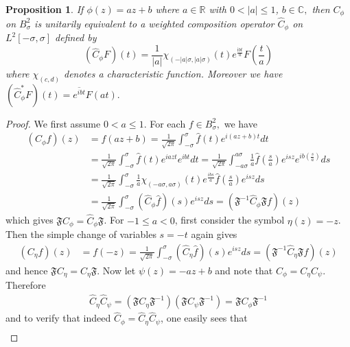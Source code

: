 \documentclass[11pt]{amsart}%
\numberwithin{equation}{section}
\theoremstyle{plain}
\newtheorem{prop}[thm]{Proposition}
\theoremstyle{definition}
\theoremstyle{definition}
\begin{document}
\begin{prop}\label{adjoint formula} If $\phi(z)=az+b$ where $a\in \mathbb{R}$ with $0<|a|\leq 1$, $b\in \mathbb{C},$ then $C_{\phi}$ on $ B^2_{\sigma}$ is unitarily equivalent to a weighted composition operator $\widehat{C}_{\phi}$ on $L^2[-\sigma,\sigma]$ defined by 
\[(\widehat{C}_{\phi}F)(t)=\frac{1}{|a|}\chi_{(-|a|\sigma, |a|\sigma)}(t)e^{\frac{\mathrm{i}bt}{a}}F\left(\frac{t}{a}\right)\] 
where $\chi_{(c,d)}$ denotes a characteristic function. Moreover we have $(\widehat{C}_{\phi}^*F)(t)=\overline{e^{ibt}}F(at).$
\end{prop}
\begin{proof} We first assume $0<a\leq 1.$ For each $f\in B^2_{\sigma},$ we have
\begin{align}
(C_{\phi}f)(z)&=f(az+b)=\frac{1}{\sqrt{2\pi}}\int^\sigma_{-\sigma}\widehat{f}(t)e ^{i(az+b)t}dt\nonumber\\
&=\frac{1}{\sqrt{2\pi}}\int^\sigma_{-\sigma}\widehat{f}(t)e ^{iazt}e^{ibt}dt=\frac{1}{\sqrt{2\pi}}\int^{a\sigma}_{-a\sigma}\frac{1}{a}\widehat{f}\left(\frac{s}{a}\right)e ^{isz}e^{ib\left(\frac{s}{a}\right)}ds\nonumber\\
&=\frac{1}{\sqrt{2\pi}}\int^{\sigma}_{-\sigma}\frac{1}{a}\chi_{(-a\sigma, a\sigma)}(t)e^{\frac{ibs}{a}}\widehat{f}\left(\frac{s}{a}\right)e ^{isz}ds\nonumber\\
&=\frac{1}{\sqrt{2\pi}}\int^{\sigma}_{-\sigma}(\widehat{C}_{\phi}\widehat{f})(s)e ^{isz}ds=(\mathfrak{F}^{-1}\widehat{C}_\phi\mathfrak{F}f)(z)\nonumber
\end{align}
which gives $\mathfrak{F}C_{\phi}= \widehat{C}_{\phi}\mathfrak{F}$. For $-1\leq a <0$, first consider the symbol $\eta(z)=-z$. Then the simple change of variables $s=-t$ again gives
\begin{align}\label{eqc3}
(C_{\eta}f)(z)&=f(-z)=\frac{1}{\sqrt{2\pi}}\int^{\sigma}_{-\sigma}(\widehat{C}_{\eta}\widehat{f})(s)e ^{isz}ds=(\mathfrak{F}^{-1}\widehat{C}_\eta\mathfrak{F}f)(z)
\end{align}
and hence $\mathfrak{F}C_{\eta}= \widehat{C}_{\eta}\mathfrak{F}.$  Now let $\psi(z)=-az+b$ and note that $C_{\phi}=C_{\eta}C_{\psi}.$ Therefore 
\begin{align*}
\widehat{C}_{\eta}\widehat{C}_{\psi}=(\mathfrak{F}C_{\eta}\mathfrak{F}^{-1})(\mathfrak{F}C_{\psi}\mathfrak{F}^{-1})=\mathfrak{F}C_{\phi}\mathfrak{F}^{-1}
\end{align*}
and to verify that indeed $\widehat{C}_\phi=\widehat{C}_{\eta}\widehat{C}_{\psi}$, one easily sees that
\begin{align*}

\end{align*}
\end{proof}
\end{document}
